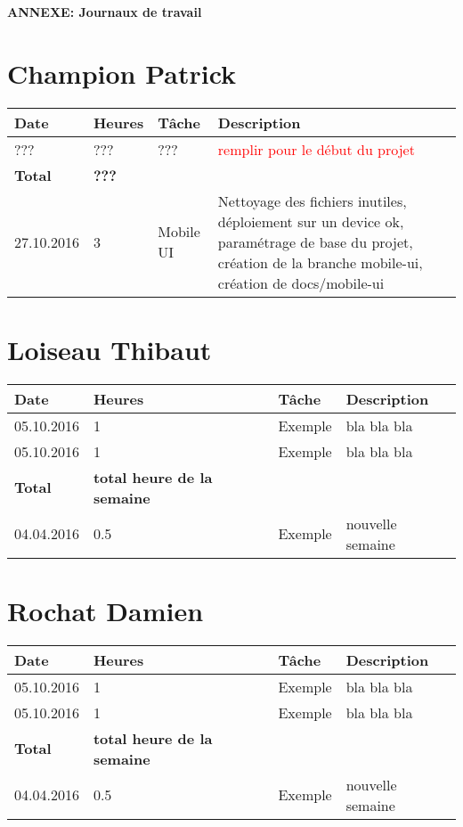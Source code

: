 \documentclass[french]{article}
\begin{document}
	\centering
	\large{\textbf{ANNEXE: Journaux de travail}}
	
	\justify
	
	\section*{Champion Patrick}
	\begin{longtable}{p{}|p{}|p{}|p{}}
		Date&Heures&Tâche&Description\\
		\hline \hline
		??? & ??? & ??? & \textcolor{red}{remplir pour le début du projet}\\
		\textbf{Total} & \textbf{???} &&\\
		\hline
		27.10.2016 & 3 & Mobile UI & Nettoyage des fichiers inutiles, déploiement sur un device ok, paramétrage de base du projet, création de la branche mobile-ui, création de docs/mobile-ui\\
	\end{longtable}

	\section*{Loiseau Thibaut}
	\begin{longtable}{p{}|p{}|p{}|p{}}
		Date&Heures&Tâche&Description\\
		\hline \hline
		05.10.2016 & 1 & Exemple & bla bla bla\\
		05.10.2016 & 1 & Exemple & bla bla bla\\
		\textbf{Total} & \textbf{total heure de la semaine} &&\\
		\hline
		04.04.2016 & 0.5 & Exemple & nouvelle semaine \\
	\end{longtable}
	
	\section*{Rochat Damien}
	\begin{longtable}{p{}|p{}|p{}|p{}}
		Date&Heures&Tâche&Description\\
		\hline \hline
		05.10.2016 & 1 & Exemple & bla bla bla\\
		05.10.2016 & 1 & Exemple & bla bla bla\\
		\textbf{Total} & \textbf{total heure de la semaine} &&\\
		\hline
		04.04.2016 & 0.5 & Exemple & nouvelle semaine \\
	\end{longtable}
	
\end{document}

